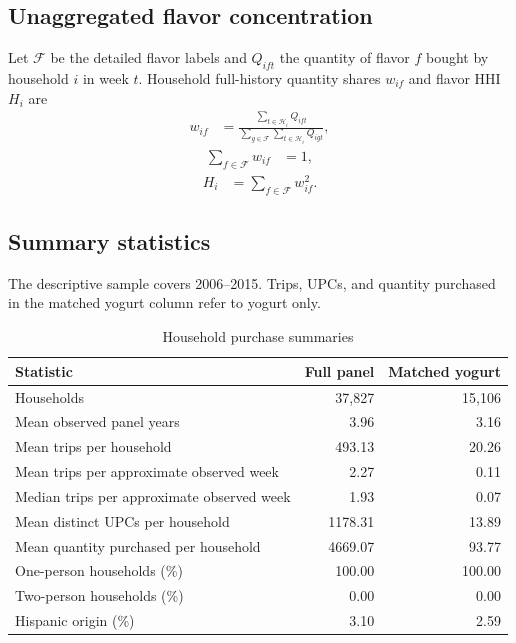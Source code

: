 \documentclass[11pt]{article}
\begin{document}
\subsection{Unaggregated flavor concentration}
Let $\mathcal F$ be the detailed flavor labels and $Q_{ift}$ the quantity of
flavor $f$ bought by household $i$ in week $t$. Household full-history quantity
shares $w_{if}$ and flavor HHI $H_i$ are
\begin{equation}
\begin{aligned}
w_{if}&=\frac{\sum_{t\in\mathcal H_i}Q_{ift}}{\sum_{g\in\mathcal F}\sum_{t\in\mathcal H_i}Q_{igt}},
\end{aligned}
\end{equation}
\begin{equation}
\begin{aligned}
\sum_{f\in\mathcal F}w_{if}&=1,
\end{aligned}
\end{equation}
\begin{equation}
\begin{aligned}
H_i&=\sum_{f\in\mathcal F}w_{if}^2.
\end{aligned}
\end{equation}


\clearpage

\subsection{Summary statistics}
The descriptive sample covers 2006--2015. Trips, UPCs, and quantity purchased in the matched yogurt column refer
to yogurt only.

\begin{table}[htbp]\centering\small
\caption{Household purchase summaries}
\label{tab:sample-summary}
\begin{tabular}{lrr}\toprule
Statistic & Full panel & Matched yogurt\\\midrule
Households & 37,827 & 15,106\\
Mean observed panel years & 3.96 & 3.16\\
Mean trips per household & 493.13 & 20.26\\
Mean trips per approximate observed week & 2.27 & 0.11\\
Median trips per approximate observed week & 1.93 & 0.07\\
Mean distinct UPCs per household & 1178.31 & 13.89\\
Mean quantity purchased per household & 4669.07 & 93.77\\
One-person households (\%) & 100.00 & 100.00\\
Two-person households (\%) & 0.00 & 0.00\\
Hispanic origin (\%) & 3.10 & 2.59\\
\bottomrule\end{tabular}
\end{table}
\end{document}
